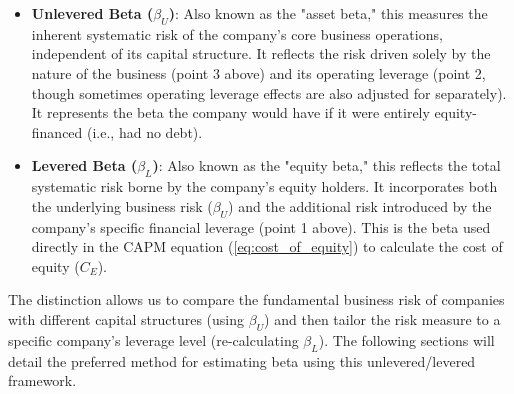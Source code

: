 \begin{itemize}
    \item \textbf{Unlevered Beta (\(\beta_U\))}: Also known as the "asset beta," this measures the inherent systematic risk of the company's core business operations, independent of its capital structure. It reflects the risk driven solely by the nature of the business (point 3 above) and its operating leverage (point 2, though sometimes operating leverage effects are also adjusted for separately). It represents the beta the company would have if it were entirely equity-financed (i.e., had no debt).
    \item \textbf{Levered Beta (\(\beta_L\))}: Also known as the "equity beta," this reflects the total systematic risk borne by the company's equity holders. It incorporates both the underlying business risk (\(\beta_U\)) and the additional risk introduced by the company's specific financial leverage (point 1 above). This is the beta used directly in the CAPM equation (\ref{eq:cost_of_equity}) to calculate the cost of equity (\(C_E\)).
\end{itemize}

The distinction allows us to compare the fundamental business risk of companies with different capital structures (using \(\beta_U\)) and then tailor the risk measure to a specific company's leverage level (re-calculating \(\beta_L\)). The following sections will detail the preferred method for estimating beta using this unlevered/levered framework.

